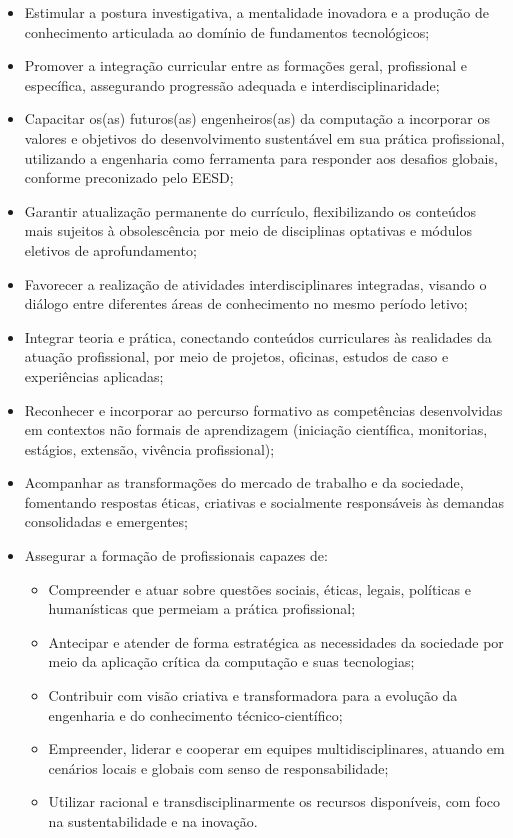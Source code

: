 \begin{itemize}
    \item Estimular a postura investigativa, a mentalidade inovadora e a produção de conhecimento articulada ao domínio de fundamentos tecnológicos;
    \item Promover a integração curricular entre as formações geral, profissional e específica, assegurando progressão adequada e interdisciplinaridade;
    \item Capacitar os(as) futuros(as) engenheiros(as) da computação a incorporar os valores e objetivos do desenvolvimento sustentável em sua prática profissional, utilizando a engenharia como ferramenta para responder aos desafios globais, conforme preconizado pelo EESD;
    \item Garantir atualização permanente do currículo, flexibilizando os conteúdos mais sujeitos à obsolescência por meio de disciplinas optativas e módulos eletivos de aprofundamento;
    \item Favorecer a realização de atividades interdisciplinares integradas, visando o diálogo entre diferentes áreas de conhecimento no mesmo período letivo;
    \item Integrar teoria e prática, conectando conteúdos curriculares às realidades da atuação profissional, por meio de projetos, oficinas, estudos de caso e experiências aplicadas;
    \item Reconhecer e incorporar ao percurso formativo as competências desenvolvidas em contextos não formais de aprendizagem (iniciação científica, monitorias, estágios, extensão, vivência profissional);
    \item Acompanhar as transformações do mercado de trabalho e da sociedade, fomentando respostas éticas, criativas e socialmente responsáveis às demandas consolidadas e emergentes;
    \item Assegurar a formação de profissionais capazes de:
    \begin{itemize}
        \item Compreender e atuar sobre questões sociais, éticas, legais, políticas e humanísticas que permeiam a prática profissional;
        \item Antecipar e atender de forma estratégica as necessidades da sociedade por meio da aplicação crítica da computação e suas tecnologias;
        \item Contribuir com visão criativa e transformadora para a evolução da engenharia e do conhecimento técnico-científico;
        \item Empreender, liderar e cooperar em equipes multidisciplinares, atuando em cenários locais e globais com senso de responsabilidade;
        \item Utilizar racional e transdisciplinarmente os recursos disponíveis, com foco na sustentabilidade e na inovação.
    \end{itemize}
\end{itemize}